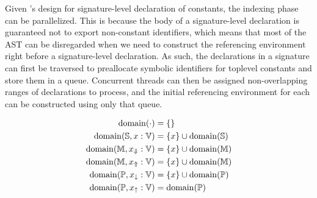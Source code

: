 Given \Beluga's design for signature-level declaration of constants, the indexing phase can be parallelized.
This is because the body of a signature-level declaration is guaranteed not to export non-constant identifiers, which means that most of the \ac{AST} can be disregarded when we need to construct the referencing environment right before a signature-level declaration.
As such, the declarations in a signature can first be traversed to preallocate symbolic identifiers for toplevel constants and store them in a queue.
Concurrent threads can then be assigned non-overlapping ranges of declarations to process, and the initial referencing environment for each can be constructed using only that queue.

\newcommand{\Fail}{\lightning}
\newcommand{\Lookup}[2]{\operatorname{lookup}\left[#1\right]\left(#2\right)}
\newcommand{\Domain}{\operatorname{domain}}
\begin{equation*}
\begin{aligned}
\Domain(\cdot) &= \{\}\\
\Domain(\Scope, x : \Var) &= \{x\} \cup \Domain(\Scope)\\
\Domain(\Module, \Private{x} : \Var) &= \{x\} \cup \Domain(\Module)\\
\Domain(\Module, \Public{x} : \Var) &= \{x\} \cup \Domain(\Module)\\
\Domain(\Pattern, \private{x} : \Var) &= \{x\} \cup \Domain(\Pattern)\\
\Domain(\Pattern, \public{x} : \Var) &= \Domain(\Pattern)
\end{aligned}
\end{equation*}
